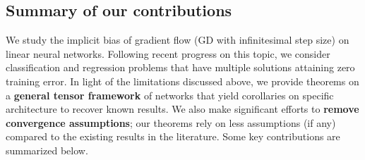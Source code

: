 \documentclass{article} %
\begin{document}
\subsection{Summary of our contributions}
We study the implicit bias of gradient flow (GD with infinitesimal step size) on linear neural networks.
Following recent progress on this topic, we consider classification and regression problems that have multiple solutions attaining zero training error.
In light of the limitations discussed above, we provide theorems on a \textbf{general tensor framework} of networks that yield corollaries on specific architecture to recover known results.
We also make significant efforts to \textbf{remove convergence assumptions}; our theorems rely on less assumptions (if any) compared to the existing results in the literature.
Some key contributions are summarized below.
\end{document}
